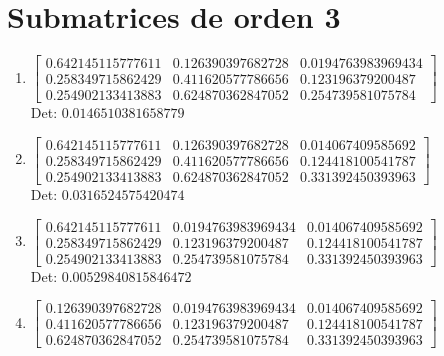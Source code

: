 \documentclass[12pt]{article}
\begin{document}
\section*{Submatrices de orden 3}

\begin{enumerate}

\item $\displaystyle \left[\begin{matrix}0.642145115777611 & 0.126390397682728 & 0.0194763983969434\\0.258349715862429 & 0.411620577786656 & 0.123196379200487\\0.254902133413883 & 0.624870362847052 & 0.254739581075784\end{matrix}\right]$\\

Det: $0.0146510381658779$\\

\item $\displaystyle \left[\begin{matrix}0.642145115777611 & 0.126390397682728 & 0.014067409585692\\0.258349715862429 & 0.411620577786656 & 0.124418100541787\\0.254902133413883 & 0.624870362847052 & 0.331392450393963\end{matrix}\right]$\\

Det: $0.0316524575420474$\\

\item $\displaystyle \left[\begin{matrix}0.642145115777611 & 0.0194763983969434 & 0.014067409585692\\0.258349715862429 & 0.123196379200487 & 0.124418100541787\\0.254902133413883 & 0.254739581075784 & 0.331392450393963\end{matrix}\right]$\\

Det: $0.00529840815846472$\\

\item $\displaystyle \left[\begin{matrix}0.126390397682728 & 0.0194763983969434 & 0.014067409585692\\0.411620577786656 & 0.123196379200487 & 0.124418100541787\\0.624870362847052 & 0.254739581075784 & 0.331392450393963\end{matrix}\right]$\\


\end{enumerate}
\end{document}
